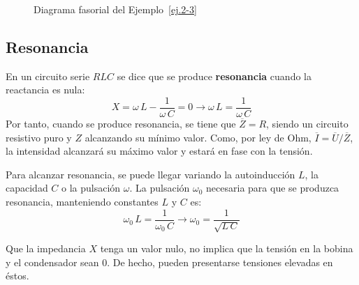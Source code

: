 \documentclass[11pt]{book} %
\begin{document}
\begin{example}
\begin{figure}[H]
			\caption{Diagrama fasorial del Ejemplo~\ref{ej.2-3}}
			\label{fig.diagrama_fasorial_ejemplo2-3}
		\end{figure}
		
	\end{example}
	
	\subsection{Resonancia}\label{sec.resonancia_serie}
	
	En un circuito serie $RLC$ se dice que se produce \textbf{resonancia} cuando la reactancia es nula:
	\begin{equation*}
		X=\omega\,L-\dfrac{1}{\omega\,C}=0\rightarrow \omega\,L=\dfrac{1}{\omega\,C}
	\end{equation*}
	Por tanto, cuando se produce resonancia, se tiene que $\overline{Z}=R$, siendo un circuito resistivo puro y $Z$ alcanzando su mínimo valor. Como, por ley de Ohm, $\overline{I}=\overline{U}/\overline{Z}$, la intensidad alcanzará su máximo valor y estará en fase con la tensión. 
	
	Para alcanzar resonancia, se puede llegar variando la autoinducción $L$, la capacidad $C$ o la pulsación $\omega$. La pulsación $\omega_0$ necesaria para que se produzca resonancia, manteniendo constantes $L$ y $C$ es:
	\begin{equation}
		\omega_0\,L=\dfrac{1}{\omega_0\,C}\rightarrow \boxed{\omega_0=\dfrac{1}{\sqrt{L\,C}}}
	\end{equation}
	\begin{remark}
		Que la impedancia $X$ tenga un valor nulo, no implica que la tensión en la bobina y el condensador sean 0. De hecho, pueden presentarse tensiones elevadas en éstos.
	\end{remark}
	
\end{document}
